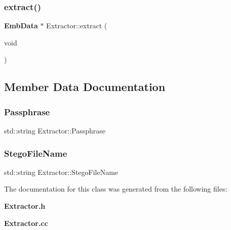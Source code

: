 \subsubsection{extract()}
{\footnotesize\ttfamily \textbf{ Emb\+Data} $\ast$ Extractor\+::extract (\begin{DoxyParamCaption}\item[{void}]{ }\end{DoxyParamCaption})}



\subsection{Member Data Documentation}
\mbox{\label{classExtractor_a4ad69546940daee44a7f42019932609a}} 
\subsubsection{Passphrase}
{\footnotesize\ttfamily std\+::string Extractor\+::\+Passphrase\hspace{0.3cm}{\ttfamily [private]}}

\mbox{\label{classExtractor_ae41bce787c79531ec1ed382f5286b472}} 
\subsubsection{Stego\+File\+Name}
{\footnotesize\ttfamily std\+::string Extractor\+::\+Stego\+File\+Name\hspace{0.3cm}{\ttfamily [private]}}



The documentation for this class was generated from the following files\+:\begin{DoxyCompactItemize}
\item 
\textbf{ Extractor.\+h}\item 
\textbf{ Extractor.\+cc}\end{DoxyCompactItemize}
